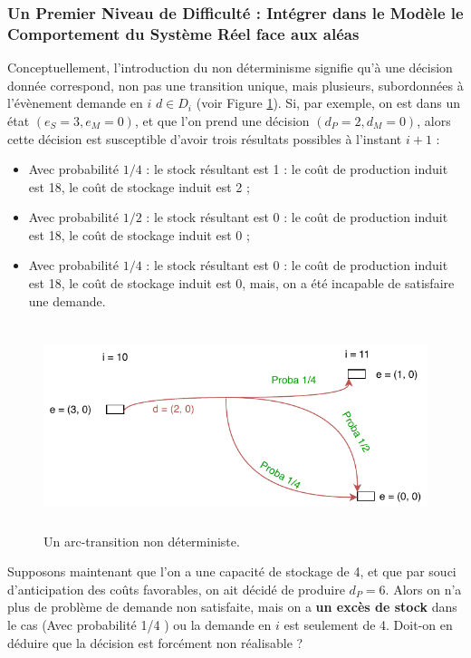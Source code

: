 \subsubsection{Un Premier Niveau de Difficulté : Intégrer dans le Modèle le Comportement du Système Réel face aux aléas}
\label{Premier_Niveau_de_Diff}
Conceptuellement, l'introduction du non déterminisme signifie qu'à une décision donnée correspond, non pas une transition unique, mais plusieurs, subordonnées à l'évènement \og demande en $i$ \fg{} $d \in D_i$ (voir Figure \ref{arc-transition}). Si, par exemple, on est dans un état $(e_S = 3, e_M = 0)$, et que l'on prend une décision $(d_P = 2, d_M = 0)$, alors cette décision est susceptible d'avoir trois résultats possibles à l'instant $i+1$ :
\begin{itemize}[label=$\square$]
	\item	Avec probabilité $1/4$ : le stock résultant est 1 : le coût de production induit est 18, le coût de stockage induit est 2 ;
	\item	 Avec probabilité $1/2$  : le stock résultant est 0 : le coût de production induit est 18, le coût de stockage induit est 0 ;
	\item	Avec probabilité $1/4$ : le stock résultant est 0 : le coût de production induit est 18, le coût de stockage induit est 0, mais, on a été incapable de satisfaire une demande. 
\end{itemize}
\begin{figure}[H]
	\centerline{
		\includegraphics[height=6cm]{images_these/arc-transition.pdf}}
	\caption[Un arc-transition non déterministe. ]{Un arc-transition non déterministe.}
	\label{arc-transition}
\end{figure}

Supposons maintenant que l'on a une capacité de stockage de 4, et que par souci d'anticipation des coûts favorables, on ait décidé de produire $d_P = 6$. Alors on n'a plus de problème de demande non satisfaite, mais on a \textbf{un excès de stock} dans le cas (Avec probabilité 1/4 ) ou la demande en $i$ est seulement de 4. Doit-on en déduire que la décision est forcément non réalisable ?

